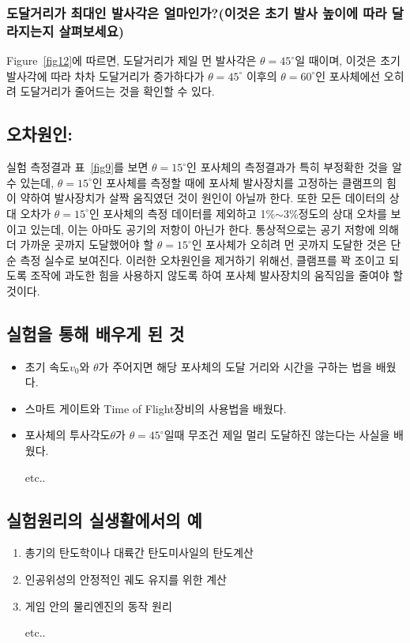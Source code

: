 \documentclass[12pt,a4paper]{article}
\begin{document}
        \subsubsection{도달거리가 최대인 발사각은 얼마인가?(이것은 초기 발사 높이에 따라 달라지는지 살펴보세요)}
        Figure~\ref{fig12}에 따르면, 도달거리가 제일 먼 발사각은 $\theta=45^{\circ}$일 때이며, 이것은 초기 발사각에
        따라 차차 도달거리가 증가하다가 $\theta=45^{\circ}$ 이후의 $\theta=60^{\circ}$인 포사체에선
        오히려 도달거리가 줄어드는 것을 확인할 수 있다.
    \subsection{오차원인:}
    실험 측정결과 표~\ref{fig9}를 보면 $\theta=15^{\circ}$인 포사체의 측정결과가 특히 부정확한 것을 알 수 있는데,
    $\theta=15^{\circ}$인 포사체를 측정할 때에 포사체 발사장치를 고정하는 클램프의 힘이 약하여 발사장치가 살짝 움직였던
    것이 원인이 아닐까 한다. 또한 모든 데이터의 상대 오차가 $\theta=15^{\circ}$인 포사체의 측정 데이터를 제외하고
    1\%$\sim$3\%정도의 상대 오차를 보이고 있는데, 이는 아마도 공기의 저항이 아닌가 한다. 통상적으로는 공기 저항에 의해
    더 가까운 곳까지 도달했어야 할 $\theta=15^{\circ}$인 포사체가 오히려 먼 곳까지 도달한 것은 단순 측정 실수로 보여진다.
    이러한 오차원인을 제거하기 위해선, 클램프를 꽉 조이고 되도록 조작에 과도한 힘을 사용하지 않도록 하여 포사체 발사장치의
    움직임을 줄여야 할 것이다.
    \subsection{실험을 통해 배우게 된 것}
    \begin{itemize}
        \item 초기 속도$v_0$와 $\theta$가 주어지면 해당 포사체의 도달 거리와 시간을 구하는 법을 배웠다.
        \item 스마트 게이트와 Time of Flight장비의 사용법을 배웠다.
        \item 포사체의 투사각도$\theta$가 $\theta=45^{\circ}$일때 무조건 제일 멀리 도달하진 않는다는 사실을 배웠다.
        \item [etc..]
    \end{itemize}
    \subsection{실험원리의 실생활에서의 예}
    \begin{enumerate}
    \item 총기의 탄도학이나 대륙간 탄도미사일의 탄도계산
    \item 인공위성의 안정적인 궤도 유지를 위한 계산
    \item 게임 안의 물리엔진의 동작 원리
    \item [etc..]
    \end{enumerate}
\end{document}
